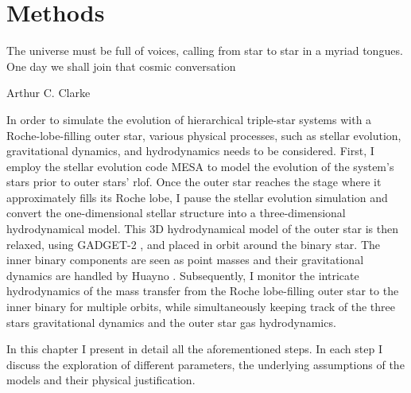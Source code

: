 \chapter{Methods}\label{methods}

\epigraph{The universe must be full of voices, calling from star to star in a myriad tongues. One day we shall join that cosmic conversation}{Arthur C. Clarke}

In order to simulate the evolution of hierarchical triple-star systems with a  Roche-lobe-filling outer star, various physical processes, such as stellar evolution, gravitational dynamics, and hydrodynamics needs to be considered. First, I employ the stellar evolution code MESA \citep{paxton2010modules,paxton2013modules,paxton2015modules,paxton2019modules} to model the evolution of the system's stars prior to outer stars' \ac{rlof}. Once the outer star reaches the stage where it approximately fills its Roche lobe, I pause the stellar evolution simulation and convert the one-dimensional stellar structure into a three-dimensional hydrodynamical model. This 3D hydrodynamical model of the outer star is then relaxed, using GADGET-2 \citep{springel2005cosmological}, and placed in orbit around the binary star. The inner binary components are seen as point masses and their gravitational dynamics are handled by Huayno \citep{pelupessy2012n}. Subsequently, I monitor the intricate hydrodynamics of the mass transfer from the Roche lobe-filling outer star to the inner binary for multiple orbits, while simultaneously keeping track of the three stars gravitational dynamics and the outer star gas hydrodynamics. 

In this chapter I present in detail all the aforementioned steps. In each step I discuss the exploration of different parameters, the underlying assumptions of the models and their physical justification.






